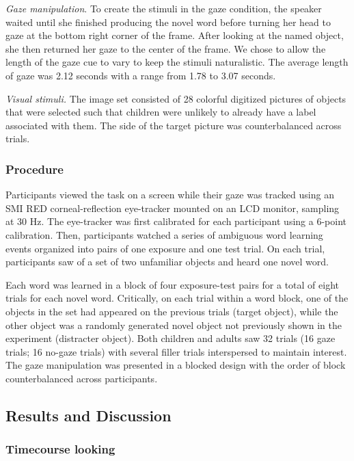 \documentclass[man,floatsintext]{apa6}
\begin{document}
\emph{Gaze manipulation}. To create the stimuli in the gaze condition,
the speaker waited until she finished producing the novel word before
turning her head to gaze at the bottom right corner of the frame. After
looking at the named object, she then returned her gaze to the center of
the frame. We chose to allow the length of the gaze cue to vary to keep
the stimuli naturalistic. The average length of gaze was 2.12 seconds
with a range from 1.78 to 3.07 seconds.

\emph{Visual stimuli.} The image set consisted of 28 colorful digitized
pictures of objects that were selected such that children were unlikely
to already have a label associated with them. The side of the target
picture was counterbalanced across trials.

\subsubsection{Procedure}\label{procedure-2}

Participants viewed the task on a screen while their gaze was tracked
using an SMI RED corneal-reflection eye-tracker mounted on an LCD
monitor, sampling at 30 Hz. The eye-tracker was first calibrated for
each participant using a 6-point calibration. Then, participants watched
a series of ambiguous word learning events organized into pairs of one
exposure and one test trial. On each trial, participants saw of a set of
two unfamiliar objects and heard one novel word.

Each word was learned in a block of four exposure-test pairs for a total
of eight trials for each novel word. Critically, on each trial within a
word block, one of the objects in the set had appeared on the previous
trials (target object), while the other object was a randomly generated
novel object not previously shown in the experiment (distracter object).
Both children and adults saw 32 trials (16 gaze trials; 16 no-gaze
trials) with several filler trials interspersed to maintain interest.
The gaze manipulation was presented in a blocked design with the order
of block counterbalanced across participants.

\subsection{Results and Discussion}\label{results-and-discussion-2}

\subsubsection{Timecourse looking}\label{timecourse-looking}
\end{document}
